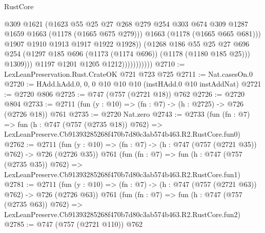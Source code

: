 \begin{lexlean}{RustCore}
\begin{coremodule}
                                    @309
                                    @1621
                                    (@1623
                                      @55
                                      @25
                                      @27
                                      @268
                                      @279
                                      @254
                                      @303
                                      @674
                                      @309
                                      @1287
                                      @1659
                                      @1663
                                      (@1178 (@1665 @675 @279)))
                                    @1663
                                    (@1178 (@1665 @665 @681)))
                                  @1907
                                  @1910
                                  @1913
                                  @1917
                                  @1922
                                  @1928))
                              (@1268
                                @186
                                @55
                                @25
                                @27
                                @696
                                @254
                                (@1297 @185 @696 (@1173 (@1174 @696)) (@1178 (@1180 @185 @25)))
                                @1309)))
                          @1197
                          @1201
                          @1205
                          @1212)))))))))))
@2710 := LexLeanPreservation.Rust.CrateOK @721 @723 @725
@2711 := Nat.casesOn.{0}
@2720 := HAdd.hAdd.{0, 0, 0} @10 @10 @10 (instHAdd.{0} @10 instAddNat)
@2721 := @2720 @806
@2725 := @747 (@757 (@2721 @18)) @762
@2726 := @2720 @804
@2733 := @2711 (fun (y : @10) => (fn : @7) -> (h : @2725) -> @726 (@2726 @18)) @761
@2735 := @2720 Nat.zero
@2743 := @2733
    (fun (fn : @7) =>
    fun (h : @747 (@757 (@2735 @18)) @762) =>
    LexLeanPreserve.Cb91393285268f470b7d80c3ab574b463.R2.RustCore.fun0)
@2762 := @2711
    (fun (y : @10) => (fn : @7) -> (h : @747 (@757 (@2721 @35)) @762) -> @726 (@2726 @35))
    @761
    (fun (fn : @7) =>
    fun (h : @747 (@757 (@2735 @35)) @762) =>
    LexLeanPreserve.Cb91393285268f470b7d80c3ab574b463.R2.RustCore.fun1)
@2781 := @2711
    (fun (y : @10) => (fn : @7) -> (h : @747 (@757 (@2721 @63)) @762) -> @726 (@2726 @63))
    @761
    (fun (fn : @7) =>
    fun (h : @747 (@757 (@2735 @63)) @762) =>
    LexLeanPreserve.Cb91393285268f470b7d80c3ab574b463.R2.RustCore.fun2)
@2785 := @747 (@757 (@2721 @110)) @762

\end{coremodule}
\end{lexlean}
